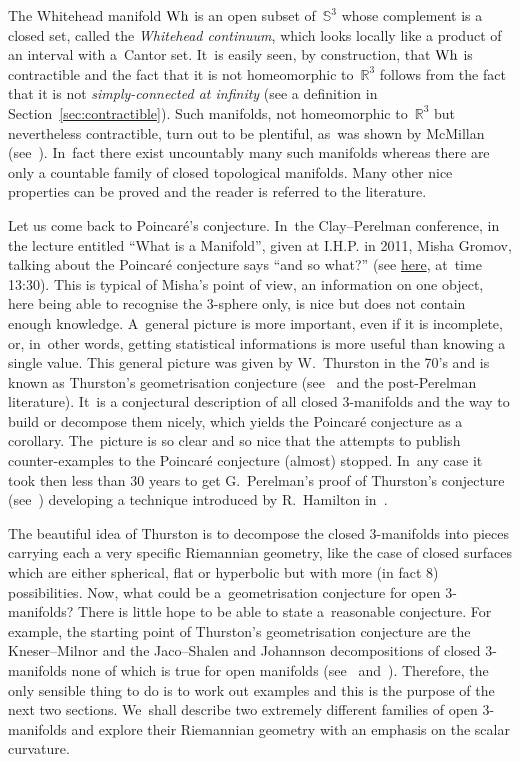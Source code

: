 \documentclass[10pt,a4paper]{amsart}
\numberwithin{equation}{section}
\begin{document}
The Whitehead manifold $\rm Wh$ is an open subset of~$\mathbb{S}^3$ whose complement is a closed set, called the \textit{Whitehead continuum}, which looks locally like a product of an interval with a~Cantor
set. It~is easily seen, by construction, that $\rm Wh$ is contractible and the fact that it is not home\-o\-mor\-phic to~$\mathbb{R}^3$ follows from the fact that it is not \textit{simply-connected at infinity} (see a definition in Section~\ref{sec:contractible}). Such manifolds, not homeomorphic to~$\mathbb{R}^3$ but nevertheless contractible, turn out to be plentiful, as~was shown by McMillan (see~\cite{McMil}). In~fact there exist uncountably many such manifolds whereas there are only a countable family of closed topological manifolds. Many other nice properties can be proved and the reader is referred to the literature.

Let us come back to Poincar\'e's conjecture. In~the Clay--Perelman conference, in the lecture entitled ``What is a Manifold'', given at I.H.P. in 2011, Misha Gromov, talking about the Poincar\'e conjecture says ``and so what?'' (see \href{https://www.youtube.com/watch?v=u5DLpAqX4YA}{here}, at~time 13:30). This is typical of Misha's point of view, an information on one object, here being able to recognise the $3$-sphere only, is nice but does not contain enough knowledge. A~general picture is
more important, even if it is incomplete, or, in~other words, getting statistical informations is more useful than knowing a single value. This general picture was given by W.~Thurston in the 70's and is known as Thurston's geometrisation conjecture (see~\cite{Thur} and the post-Perelman literature). It~is a conjectural description of all closed $3$-manifolds and
the way to build or decompose them nicely, which yields the Poincar\'e
conjecture as a corollary. The~picture is so clear and so nice that the attempts to publish counter-examples to the Poincar\'e conjecture (almost) stopped. In~any case it took then less than 30 years to get G.~Perelman's proof of Thurston's conjecture (see~\cite{Per1, Per2, Per3}) developing a technique introduced by R.~Hamilton in~\cite{Ham}.

The beautiful idea of Thurston is to decompose the closed $3$-manifolds into pieces carrying each a very specific Riemannian geometry, like the case of closed surfaces which are either spherical, flat or hyperbolic but with more (in fact 8) possibilities. Now, what could be a~geometrisation conjecture for open $3$-manifolds? There is little hope to be able to state a~reasonable conjecture. For example, the starting point of Thurston's geometrisation conjecture are the Kneser--Milnor and the Jaco--Shalen and Johannson decompositions of closed $3$-manifolds none of which is true for open manifolds (see~\cite{S-T} and~\cite{Mai}). Therefore, the only sensible thing to do is to work out examples and this is the purpose of the next two sections. We~shall describe two extremely different families of open $3$-manifolds and explore their Riemannian geometry with an emphasis on
the scalar curvature.
\end{document}
